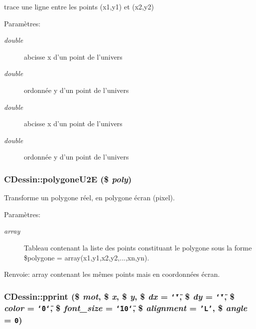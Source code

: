 trace une ligne entre les points (x1,y1) et (x2,y2) \begin{Desc}
\item[Param\`{e}tres:]
\begin{description}
\item[{\em double}]abcisse x d'un point de l'univers \item[{\em double}]ordonn\'{e}e y d'un point de l'univers \item[{\em double}]abcisse x d'un point de l'univers \item[{\em double}]ordonn\'{e}e y d'un point de l'univers\end{description}
\end{Desc}
\hypertarget{classCDessin_a12}{
\subsubsection[polygoneU2E]{\setlength{\rightskip}{0pt plus 5cm}CDessin::polygone\-U2E (\$ {\em poly})}}
\label{classCDessin_a12}


Transforme un polygone r\'{e}el, en polygone \'{e}cran (pixel). \begin{Desc}
\item[Param\`{e}tres:]
\begin{description}
\item[{\em array}]Tableau contenant la liste des points constituant le polygone sous la forme \$polygone = array(x1,y1,x2,y2,...,xn,yn). \end{description}
\end{Desc}
\begin{Desc}
\item[Renvoie:]array contenant les m\^{e}mes points mais en coordonn\'{e}es \'{e}cran.\end{Desc}
\hypertarget{classCDessin_a20}{
\subsubsection[pprint]{\setlength{\rightskip}{0pt plus 5cm}CDessin::pprint (\$ {\em mot}, \$ {\em x}, \$ {\em y}, \$ {\em dx} = {\tt \char`\"{}\char`\"{}}, \$ {\em dy} = {\tt \char`\"{}\char`\"{}}, \$ {\em color} = {\tt \char`\"{}0\char`\"{}}, \$ {\em font\_\-size} = {\tt \char`\"{}10\char`\"{}}, \$ {\em alignment} = {\tt 'L'}, \$ {\em angle} = {\tt 0})}}
\label{classCDessin_a20}


